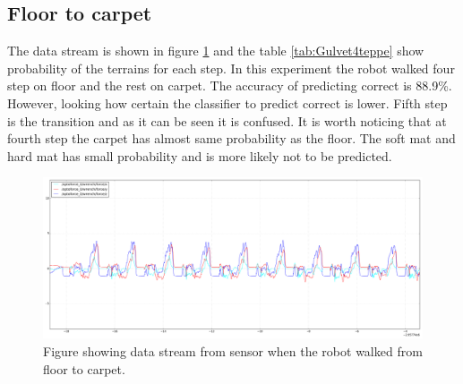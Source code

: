 \documentclass[USenglish]{ifimaster}  %
\begin{document}
\subsection{Floor to carpet}
The data stream is shown in figure \ref{fig:gulvet4teppegraf} and the table \ref{tab:Gulvet4teppe} show probability of the terrains for each step. In this experiment the robot walked four step on floor and the rest on carpet. The accuracy of predicting correct is 88.9\%. However, looking how certain the classifier to predict correct is lower. Fifth step is the transition and as it can be seen it is confused. It is worth noticing that at fourth step the carpet has almost same probability as the floor. The soft mat and hard mat has small probability and is more likely not to be predicted.

\begin{figure}[h]
    \centering
    \includegraphics[width=\textwidth,height=\textheight,keepaspectratio]{Figures/Gulvet4Teppe2}
    \caption{Figure showing data stream from sensor when the robot walked from floor to carpet.}
    \label{fig:gulvet4teppegraf}
\end{figure}


\begin{table}[h]
\centering
{}
\caption{The table showing probability of each terrain per step from floor to carpet. Marked green represent correct prediction and correct terrain, red represent wrong prediction and yellow is the correct prediction if it got wrong.}
\label{tab:Gulvet4teppe}
\end{table}
\FloatBarrier
\end{document}
